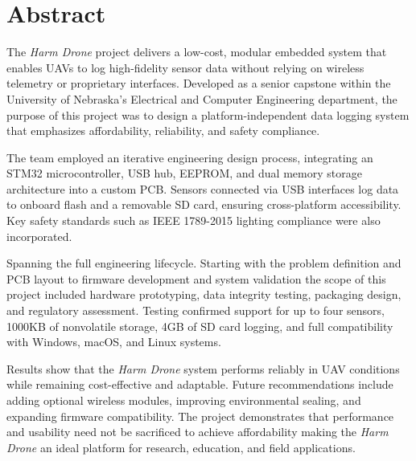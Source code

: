 \documentclass[12pt]{article}
\begin{document}
\section*{Abstract}

\par The \textit{Harm Drone} project delivers a low-cost, modular embedded system that enables UAVs to log high-fidelity sensor data without relying on wireless telemetry or proprietary interfaces. Developed as a senior capstone within the University of Nebraska’s Electrical and Computer Engineering department, the purpose of this project was to design a platform-independent data logging system that emphasizes affordability, reliability, and safety compliance.

\par The team employed an iterative engineering design process, integrating an STM32 microcontroller, USB hub, EEPROM, and dual memory storage architecture into a custom PCB. Sensors connected via USB interfaces log data to onboard flash and a removable SD card, ensuring cross-platform accessibility. Key safety standards such as IEEE 1789-2015 lighting compliance were also incorporated.

\par Spanning the full engineering lifecycle. Starting with the problem definition and PCB layout to firmware development and system validation the scope of this project included hardware prototyping, data integrity testing, packaging design, and regulatory assessment. Testing confirmed support for up to four sensors, 1000KB of nonvolatile storage, 4GB of SD card logging, and full compatibility with Windows, macOS, and Linux systems.

\par Results show that the \textit{Harm Drone} system performs reliably in UAV conditions while remaining cost-effective and adaptable. Future recommendations include adding optional wireless modules, improving environmental sealing, and expanding firmware compatibility. The project demonstrates that performance and usability need not be sacrificed to achieve affordability making the \textit{Harm Drone} an ideal platform for research, education, and field applications.
\end{document}
